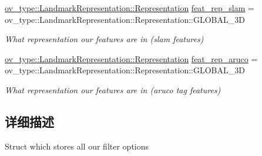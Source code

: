 \begin{DoxyCompactItemize}
\hyperlink{classov__type_1_1LandmarkRepresentation_a7f5783df6932ace7f098ae243b6d298e}{ov\+\_\+type\+::\+Landmark\+Representation\+::\+Representation} \hyperlink{structov__msckf_1_1StateOptions_a426ea4e9c3f5f269eddb356e9e7feb6c}{feat\+\_\+rep\+\_\+slam} = ov\+\_\+type\+::\+Landmark\+Representation\+::\+Representation\+::\+G\+L\+O\+B\+A\+L\+\_\+3D
\begin{DoxyCompactList}\small\item\em What representation our features are in (slam features) \end{DoxyCompactList}\item 
\mbox{\label{structov__msckf_1_1StateOptions_aa2d88cb407257f4f7d3c868e8f39ed6c}} 
\hyperlink{classov__type_1_1LandmarkRepresentation_a7f5783df6932ace7f098ae243b6d298e}{ov\+\_\+type\+::\+Landmark\+Representation\+::\+Representation} \hyperlink{structov__msckf_1_1StateOptions_aa2d88cb407257f4f7d3c868e8f39ed6c}{feat\+\_\+rep\+\_\+aruco} = ov\+\_\+type\+::\+Landmark\+Representation\+::\+Representation\+::\+G\+L\+O\+B\+A\+L\+\_\+3D
\begin{DoxyCompactList}\small\item\em What representation our features are in (aruco tag features) \end{DoxyCompactList}\end{DoxyCompactItemize}


\subsection{详细描述}
Struct which stores all our filter options 